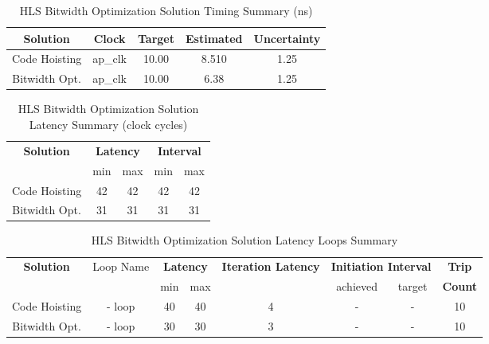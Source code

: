 \begin{table}[H]
	\centering
	\begin{tabular}{|c|c|c|c|c|}
		\hline
		\textbf{Solution} & \textbf{Clock} & \textbf{Target} & \textbf{Estimated} & \textbf{Uncertainty} \\
		\hline
		Code Hoisting & ap\_clk & 10.00 & 8.510 & 1.25 \\
		\hline
		Bitwidth Opt. & ap\_clk & 10.00 & 6.38 & 1.25 \\
		\hline
	\end{tabular}
	\caption{HLS Bitwidth Optimization Solution Timing Summary (ns)}
	\label{tab:hls-bitwidth-optimization-solution-timing-summary}
\end{table}

\begin{table}[H]
	\centering
	\begin{tabular}{|c|c|c|c|c|}
		\hline
		\multicolumn{1}{|c|}{\textbf{Solution}} & \multicolumn{2}{|c|}{\textbf{Latency}} & \multicolumn{2}{|c|}{\textbf{Interval}} \\
		& min & max & min & max \\
		\hline
		Code Hoisting & 42 & 42 & 42 & 42 \\
		\hline
		Bitwidth Opt. & 31 & 31 & 31 & 31 \\
		\hline
	\end{tabular}
	\caption{HLS Bitwidth Optimization Solution Latency Summary (clock cycles)}
	\label{tab:hls-bitwidth-optimization-solution-latency-summary}
\end{table}

\begin{table}[H]
	\centering
	\begin{tabular}{|c|c|c|c|c|c|c|c|}
		\hline
		\multicolumn{1}{|c|}{\textbf{Solution}} & \multicolumn{1}{|c|}{Loop Name} & \multicolumn{2}{|c|}{\textbf{Latency}} & \multicolumn{1}{c|}{\textbf{Iteration Latency}} & \multicolumn{2}{c|}{\textbf{Initiation Interval}} & \multicolumn{1}{c|}{\textbf{Trip}}  \\
		&  & min & max & & achieved & target & \textbf{Count} \\
		\hline
		Code Hoisting & - loop & 40 & 40 & 4 & - & - & 10 \\
		\hline
		Bitwidth Opt. & - loop & 30 & 30 & 3 & - & - & 10 \\
		\hline
	\end{tabular}
	\caption{HLS Bitwidth Optimization Solution Latency Loops Summary }
	\label{tab:hls-bitwidth-optimization-solution-loop-summary}
\end{table}

